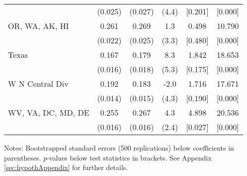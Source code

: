 \begin{landscape}
\begin{table}[ht]
{\begin{threeparttable}
\begin{tabular}{lccccc}
 & (0.025) & (0.027) & (4.4) & [0.201] & [0.000] \\ 
OR, WA, AK, HI & 0.261 & 0.269 & 1.3 & 0.498 & 10.790 \\ 
 & (0.022) & (0.025) & (3.3) & [0.480] & [0.000] \\ 
Texas & 0.167 & 0.179 & 8.3 & 1.842 & 18.653 \\ 
 & (0.016) & (0.018) & (5.3) & [0.175] & [0.000] \\ 
W N Central Div & 0.192 & 0.183 & -2.0 & 1.716 & 17.671 \\ 
 & (0.014) & (0.015) & (4.3) & [0.190] & [0.000] \\ 
WV, VA, DC, MD, DE & 0.255 & 0.267 & 4.3 & 4.898 & 20.536 \\ 
 & (0.016) & (0.016) & (2.4) & [0.027] & [0.000] \\ 
\bottomrule
\end{tabular}
{\footnotesize {\raggedright Notes: Bootstrapped standard errors (500 replications) below coefficients in parentheses. $p$-values below test statistics in brackets. See Appendix \ref{sec:hypothAppendix} for further details.}}
\end{threeparttable}
}
\end{table}
\end{landscape}
